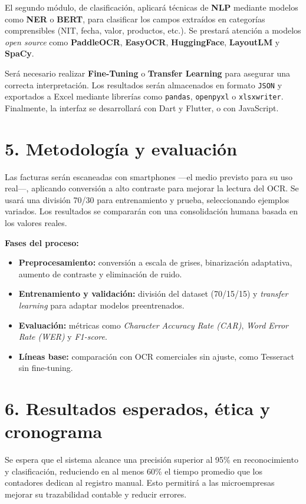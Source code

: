 \documentclass[12pt,a4paper]{article}
\begin{document}
El segundo módulo, de clasificación, aplicará técnicas de \textbf{NLP} mediante modelos como \textbf{NER} o \textbf{BERT}, para clasificar los campos extraídos en categorías comprensibles (NIT, fecha, valor, productos, etc.). Se prestará atención a modelos \textit{open source} como \textbf{PaddleOCR}, \textbf{EasyOCR}, \textbf{HuggingFace}, \textbf{LayoutLM} y \textbf{SpaCy}. 

Será necesario realizar \textbf{Fine-Tuning} o \textbf{Transfer Learning} para asegurar una correcta interpretación. Los resultados serán almacenados en formato \texttt{JSON} y exportados a Excel mediante librerías como \texttt{pandas}, \texttt{openpyxl} o \texttt{xlsxwriter}. Finalmente, la interfaz se desarrollará con Dart y Flutter, o con JavaScript.

\section*{5. Metodología y evaluación}

Las facturas serán escaneadas con smartphones —el medio previsto para su uso real—, aplicando conversión a alto contraste para mejorar la lectura del OCR. Se usará una división 70/30 para entrenamiento y prueba, seleccionando ejemplos variados. Los resultados se compararán con una consolidación humana basada en los valores reales.

\textbf{Fases del proceso:}
\begin{itemize}
    \item \textbf{Preprocesamiento:} conversión a escala de grises, binarización adaptativa, aumento de contraste y eliminación de ruido.
    \item \textbf{Entrenamiento y validación:} división del dataset (70/15/15) y \textit{transfer learning} para adaptar modelos preentrenados.
    \item \textbf{Evaluación:} métricas como \textit{Character Accuracy Rate (CAR)}, \textit{Word Error Rate (WER)} y \textit{F1-score}.
    \item \textbf{Líneas base:} comparación con OCR comerciales sin ajuste, como Tesseract sin fine-tuning.
\end{itemize}

\section*{6. Resultados esperados, ética y cronograma}

Se espera que el sistema alcance una precisión superior al 95\% en reconocimiento y clasificación, reduciendo en al menos 60\% el tiempo promedio que los contadores dedican al registro manual. Esto permitirá a las microempresas mejorar su trazabilidad contable y reducir errores.
\end{document}
